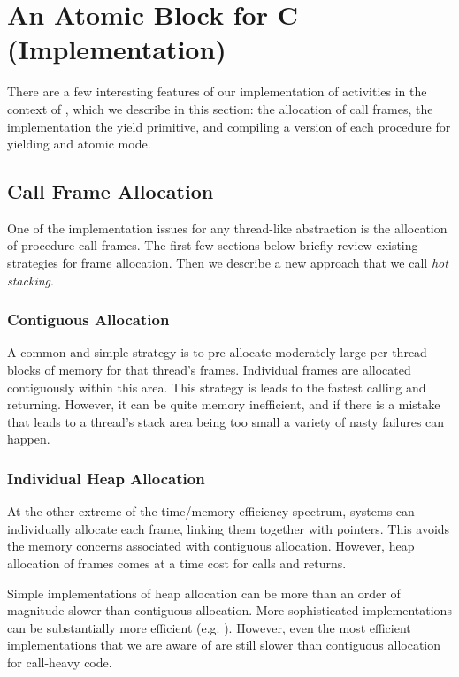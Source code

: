 \documentclass[acmsmall,anonymous,review]{acmart}\settopmatter{printfolios=true,printccs=false,printacmref=false}
\begin{document}
\section{An Atomic Block for C (Implementation)}

There are a few interesting features of our implementation of activities in the context of \charcoal{}, which we describe in this section: the allocation of call frames, the implementation the yield primitive, and compiling a version of each procedure for yielding and atomic mode.

\subsection{Call Frame Allocation}

One of the implementation issues for any thread-like abstraction is the allocation of procedure call frames.
The first few sections below briefly review existing strategies for frame allocation.
Then we describe a new approach that we call \emph{hot stacking}.

\subsubsection{Contiguous Allocation}

A common and simple strategy is to pre-allocate moderately large per-thread blocks of memory for that thread's frames.
Individual frames are allocated contiguously within this area.
This strategy is leads to the fastest calling and returning.
However, it can be quite memory inefficient, and if there is a mistake that leads to a thread's stack area being too small a variety of nasty failures can happen.

\subsubsection{Individual Heap Allocation}

At the other extreme of the time/memory efficiency spectrum, systems can individually allocate each frame, linking them together with pointers.
This avoids the memory concerns associated with contiguous allocation.
However, heap allocation of frames comes at a time cost for calls and returns.

Simple implementations of heap allocation can be more than an order of magnitude slower than contiguous allocation.
More sophisticated implementations can be substantially more efficient (e.g. \cite{Shao2000}).
However, even the most efficient implementations that we are aware of are still slower than contiguous allocation for call-heavy code.
\end{document}
